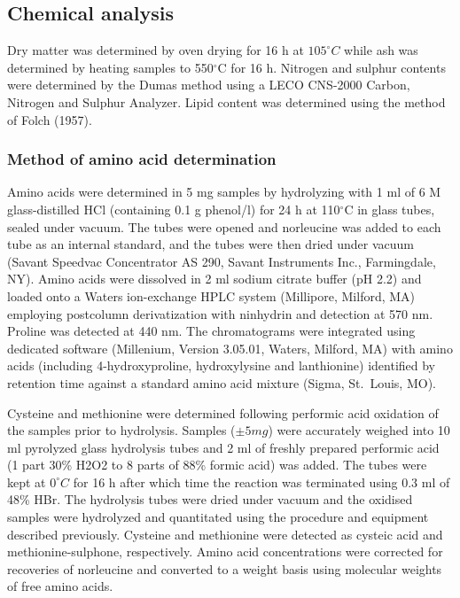 \documentclass[
]{article}
\begin{document}
\hypertarget{chemical-analysis}{%
\subsection{Chemical analysis}\label{chemical-analysis}}

Dry matter was determined by oven drying for 16 h at \(105^\circ C\) while ash was determined by heating samples to 550\(^\circ\)C for 16 h. Nitrogen and sulphur contents were determined by the Dumas method using a LECO CNS-2000 Carbon, Nitrogen and Sulphur Analyzer. Lipid content was determined using the method of Folch (1957).

\hypertarget{method-of-amino-acid-determination}{%
\subsubsection{Method of amino acid determination}\label{method-of-amino-acid-determination}}

Amino acids were determined in 5 mg samples by hydrolyzing with 1 ml of 6 M glass-distilled HCl (containing 0.1 g phenol/l) for 24 h at 110\(^\circ\)C in glass tubes, sealed under vacuum. The tubes were opened and norleucine was added to each tube as an internal standard, and the tubes were then dried under vacuum (Savant Speedvac Concentrator AS 290, Savant Instruments Inc., Farmingdale, NY). Amino acids were dissolved in 2 ml sodium citrate buffer (pH 2.2) and loaded onto a Waters ion-exchange HPLC system (Millipore, Milford, MA) employing postcolumn derivatization with ninhydrin and detection at 570 nm. Proline was detected at 440 nm. The chromatograms were integrated using dedicated software (Millenium, Version 3.05.01, Waters, Milford, MA) with amino acids (including 4-hydroxyproline, hydroxylysine and lanthionine) identified by retention time against a standard amino acid mixture (Sigma, St.~Louis, MO).

Cysteine and methionine were determined following performic acid oxidation of the samples prior to hydrolysis. Samples (\(\pm5 mg\)) were accurately weighed into 10 ml pyrolyzed glass hydrolysis tubes and 2 ml of freshly prepared performic acid (1 part 30\% H2O2 to 8 parts of 88\% formic acid) was added. The tubes were kept at \(0^\circ C\) for 16 h after which time the reaction was terminated using 0.3 ml of 48\% HBr. The hydrolysis tubes were dried under vacuum and the oxidised samples were hydrolyzed and quantitated using the procedure and equipment described previously. Cysteine and methionine were detected as cysteic acid and methionine-sulphone, respectively. Amino acid concentrations were corrected for recoveries of norleucine and converted to a weight basis using molecular weights of free amino acids.
\end{document}
